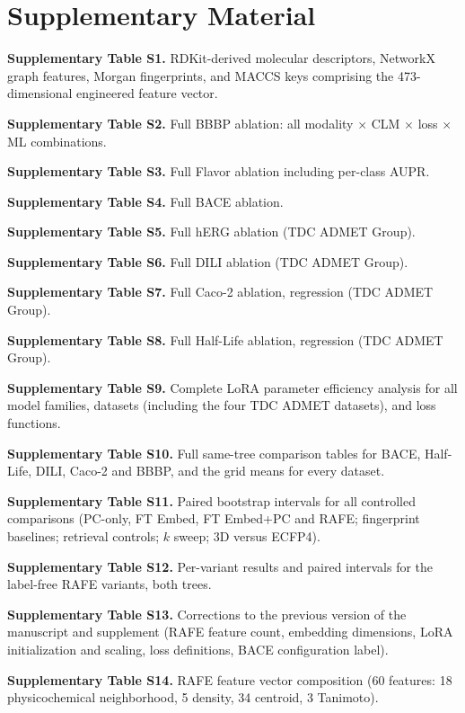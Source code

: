 \documentclass[pdflatex,sn-mathphys-num,Numbered]{sn-jnl}%
\begin{document}
\section*{Supplementary Material}\label{sec:supplementary}

\noindent\textbf{Supplementary Table S1.} RDKit-derived molecular descriptors, NetworkX graph features, Morgan fingerprints, and MACCS keys comprising the 473-dimensional engineered feature vector.

\noindent\textbf{Supplementary Table S2.} Full BBBP ablation: all modality $\times$ CLM $\times$ loss $\times$ ML combinations.

\noindent\textbf{Supplementary Table S3.} Full Flavor ablation including per-class AUPR.

\noindent\textbf{Supplementary Table S4.} Full BACE ablation.

\noindent\textbf{Supplementary Table S5.} Full hERG ablation (TDC ADMET Group).

\noindent\textbf{Supplementary Table S6.} Full DILI ablation (TDC ADMET Group).

\noindent\textbf{Supplementary Table S7.} Full Caco-2 ablation, regression (TDC ADMET Group).

\noindent\textbf{Supplementary Table S8.} Full Half-Life ablation, regression (TDC ADMET Group).

\noindent\textbf{Supplementary Table S9.} Complete LoRA parameter efficiency analysis for all model families, datasets (including the four TDC ADMET datasets), and loss functions.

\noindent \textbf{Supplementary Table S10.} Full same-tree comparison tables for BACE, Half-Life, DILI, Caco-2 and BBBP, and the grid means for every dataset.

\noindent \textbf{Supplementary Table S11.} Paired bootstrap intervals for all controlled comparisons (PC-only, FT Embed, FT Embed+PC and RAFE; fingerprint baselines; retrieval controls; $k$ sweep; 3D versus ECFP4).

\noindent \textbf{Supplementary Table S12.} Per-variant results and paired intervals for the label-free RAFE variants, both trees.

\noindent \textbf{Supplementary Table S13.} Corrections to the previous version of the manuscript and supplement (RAFE feature count, embedding dimensions, LoRA initialization and scaling, loss definitions, BACE configuration label).

\noindent \textbf{Supplementary Table S14.} RAFE feature vector composition (60 features: 18 physicochemical neighborhood, 5 density, 34 centroid, 3 Tanimoto).
\end{document}
